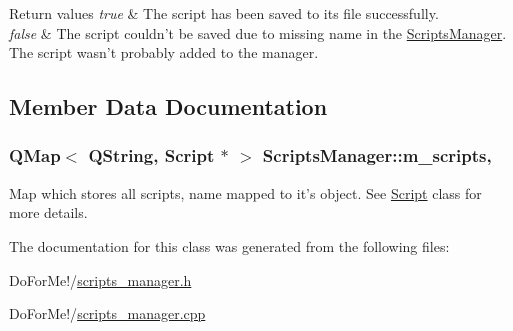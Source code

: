\begin{DoxyRetVals}{Return values}
{\em true} & The script has been saved to its file successfully. \\
\hline
{\em false} & The script couldn't be saved due to missing name in the \hyperlink{class_scripts_manager}{Scripts\-Manager}. The script wasn't probably added to the manager. \\
\hline
\end{DoxyRetVals}


\subsection{Member Data Documentation}
\hypertarget{class_scripts_manager_adcf2fffc60140c92bbca764602f322aa}{
\subsubsection[{m\-\_\-scripts}]{\setlength{\rightskip}{0pt plus 5cm}Q\-Map$<$ Q\-String, {\bf Script} $\ast$ $>$ Scripts\-Manager\-::m\-\_\-scripts\hspace{0.3cm}{\ttfamily [static]}, {\ttfamily [private]}}}\label{class_scripts_manager_adcf2fffc60140c92bbca764602f322aa}


Map which stores all scripts, name mapped to it's object. See \hyperlink{class_script}{Script} class for more details. 



The documentation for this class was generated from the following files\-:\begin{DoxyCompactItemize}
\item 
Do\-For\-Me!/\hyperlink{scripts__manager_8h}{scripts\-\_\-manager.\-h}\item 
Do\-For\-Me!/\hyperlink{scripts__manager_8cpp}{scripts\-\_\-manager.\-cpp}\end{DoxyCompactItemize}
